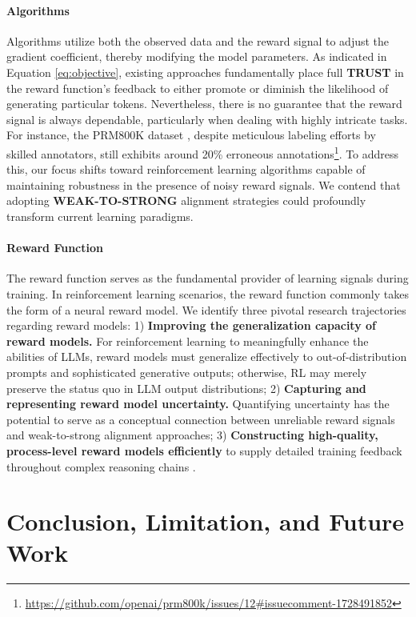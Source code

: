 \paragraph{Algorithms} Algorithms utilize both the observed data and the reward signal to adjust the gradient coefficient, thereby modifying the model parameters. As indicated in Equation \ref{eq:objective}, existing approaches fundamentally place full \textbf{TRUST} in the reward function's feedback to either promote or diminish the likelihood of generating particular tokens. Nevertheless, there is no guarantee that the reward signal is always dependable, particularly when dealing with highly intricate tasks. For instance, the PRM800K dataset \citep{lightman2023let}, despite meticulous labeling efforts by skilled annotators, still exhibits around 20\% erroneous annotations\footnote{\url{https://github.com/openai/prm800k/issues/12\#issuecomment-1728491852}}. To address this, our focus shifts toward reinforcement learning algorithms capable of maintaining robustness in the presence of noisy reward signals. We contend that adopting \textbf{WEAK-TO-STRONG} \citep{burns2023weak} alignment strategies could profoundly transform current learning paradigms.

\paragraph{Reward Function} The reward function serves as the fundamental provider of learning signals during training. In reinforcement learning scenarios, the reward function commonly takes the form of a neural reward model. We identify three pivotal research trajectories regarding reward models: 1) \textbf{Improving the generalization capacity of reward models.} For reinforcement learning to meaningfully enhance the abilities of LLMs, reward models must generalize effectively to out-of-distribution prompts and sophisticated generative outputs; otherwise, RL may merely preserve the status quo in LLM output distributions; 2) \textbf{Capturing and representing reward model uncertainty.} Quantifying uncertainty has the potential to serve as a conceptual connection between unreliable reward signals and weak-to-strong alignment approaches; 3) \textbf{Constructing high-quality, process-level reward models efficiently} to supply detailed training feedback throughout complex reasoning chains \citep{lightman2023let,wang2023math}.

\section{Conclusion, Limitation, and Future Work}

